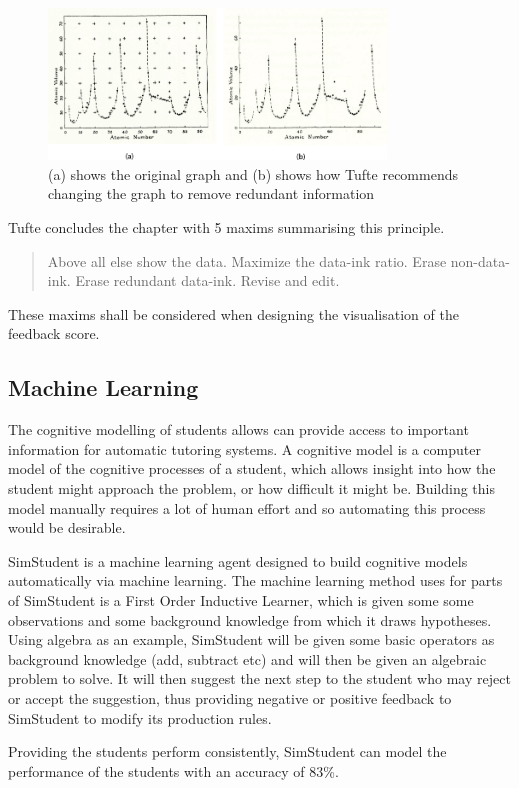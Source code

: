 \begin{figure}[h!]
\centering
\includegraphics[width=0.8\textwidth]{images/tuftegraphs.png}
\caption{(a) shows the original graph and (b) shows how Tufte recommends changing the graph to remove redundant information}
\label{fig:tuftegraphs}
\end{figure}


Tufte concludes the chapter with 5 maxims summarising this principle.

\begin{verse}Above all else show the data.
	Maximize the data-ink ratio.
	Erase non-data-ink.
	Erase redundant data-ink.
Revise and edit.
\end{verse}

These maxims shall be considered when designing the visualisation of the feedback score.

\subsection{Machine Learning}
The cognitive modelling of students allows can provide access to important information for automatic tutoring systems. A cognitive model is a computer model of the cognitive processes of a student, which allows insight into how the student might approach the problem, or how difficult it might be. Building this model manually requires a lot of human effort\cite{simstudent_better} and so automating this process would be desirable.

SimStudent is a machine learning agent designed to build cognitive models automatically via machine learning. The machine learning method uses for parts of SimStudent is a First Order Inductive Learner, which is given some some observations and some background knowledge from which it draws hypotheses. Using algebra as an example, SimStudent will be given some basic operators as background knowledge (add, subtract etc) and will then be given an algebraic problem to solve. It will then suggest the next step to the student who may reject or accept the suggestion, thus providing negative or positive feedback to SimStudent to modify its production rules.

Providing the students perform consistently, SimStudent can model the performance of the students with an accuracy of 83\%\cite{simstudent}.
